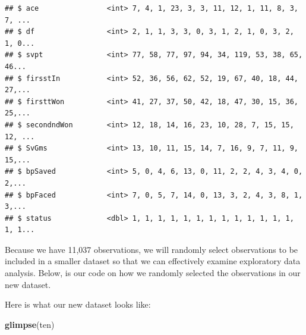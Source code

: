 \documentclass[]{article}
\newenvironment{Shaded}{\begin{snugshade}}{\end{snugshade}}
\newcommand{\DecValTok}[1]{\textcolor[rgb]{0.00,0.00,0.81}{#1}}
\newcommand{\KeywordTok}[1]{\textcolor[rgb]{0.13,0.29,0.53}{\textbf{#1}}}
\newcommand{\NormalTok}[1]{#1}
\newcommand{\OperatorTok}[1]{\textcolor[rgb]{0.81,0.36,0.00}{\textbf{#1}}}
\newcommand{\StringTok}[1]{\textcolor[rgb]{0.31,0.60,0.02}{#1}}
\begin{document}
\begin{verbatim}
## $ ace                <int> 7, 4, 1, 23, 3, 3, 11, 12, 1, 11, 8, 3, 7, ...
## $ df                 <int> 2, 1, 1, 3, 3, 0, 3, 1, 2, 1, 0, 3, 2, 1, 0...
## $ svpt               <int> 77, 58, 77, 97, 94, 34, 119, 53, 38, 65, 46...
## $ firsstIn           <int> 52, 36, 56, 62, 52, 19, 67, 40, 18, 44, 27,...
## $ firsttWon          <int> 41, 27, 37, 50, 42, 18, 47, 30, 15, 36, 25,...
## $ secondndWon        <int> 12, 18, 14, 16, 23, 10, 28, 7, 15, 15, 12, ...
## $ SvGms              <int> 13, 10, 11, 15, 14, 7, 16, 9, 7, 11, 9, 15,...
## $ bpSaved            <int> 5, 0, 4, 6, 13, 0, 11, 2, 2, 4, 3, 4, 0, 2,...
## $ bpFaced            <int> 7, 0, 5, 7, 14, 0, 13, 3, 2, 4, 3, 8, 1, 3,...
## $ status             <dbl> 1, 1, 1, 1, 1, 1, 1, 1, 1, 1, 1, 1, 1, 1, 1...
\end{verbatim}

Because we have 11,037 observations, we will randomly select
observations to be included in a smaller dataset so that we can
effectively examine exploratory data analysis. Below, is our code on how
we randomly selected the observations in our new dataset.

\begin{Shaded}
\end{Shaded}

Here is what our new dataset looks like:

\begin{Shaded}
\begin{Highlighting}[]
\KeywordTok{glimpse}\NormalTok{(ten)}
\end{Highlighting}
\end{Shaded}
\end{document}
